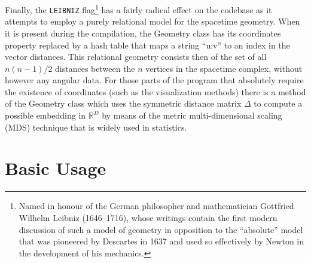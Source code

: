\documentclass[12pt,letterpaper]{report}
\begin{document}
Finally, the \texttt{LEIBNIZ} flag\footnote{Named in honour of the German philosopher and 
mathematician Gottfried Wilhelm Leibniz (1646--1716), whose writings contain the first 
modern discussion of such a model of geometry in opposition to the ``absolute'' model that 
was pioneered by Descartes in 1637 and used so effectively by Newton in the development of 
his mechanics.} has a fairly radical effect on the codebase as it attempts to employ a purely 
relational model for the spacetime geometry. When it is present during the compilation, the 
Geometry class has its coordinates property replaced by a hash table that maps a string 
``u:v'' to an index in the vector distances. This relational geometry consists then of the 
set of all $n(n-1)/2$ distances between the $n$ vertices in the spacetime complex, without 
however any angular data. For those parts of the program that absolutely require the 
existence of coordinates (such as the visualization methods) there is a method of the Geometry 
class which uses the symmetric distance matrix $\Delta$ to compute a possible embedding in 
$\mathbb{R}^D$ by means of the metric multi-dimensional scaling (MDS) technique that is widely 
used in statistics.   

\section{Basic Usage}
\end{document}
